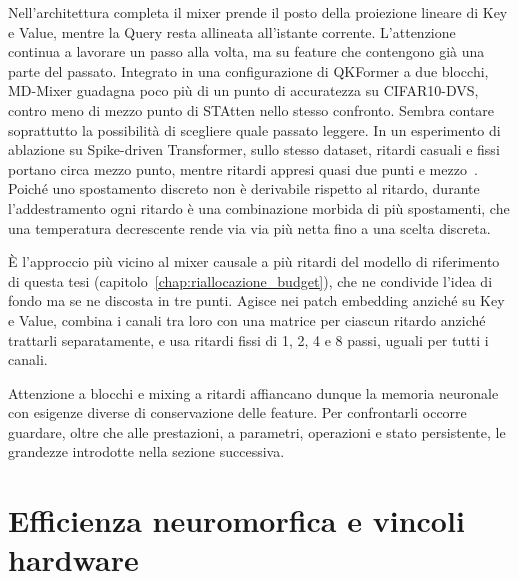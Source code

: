 Nell'architettura completa il mixer prende il posto della proiezione lineare di Key e Value, mentre la Query resta allineata all'istante corrente. L'attenzione continua a lavorare un passo alla volta, ma su feature che contengono già una parte del passato. Integrato in una configurazione di QKFormer a due blocchi, MD-Mixer guadagna poco più di un punto di accuratezza su CIFAR10-DVS, contro meno di mezzo punto di STAtten nello stesso confronto. Sembra contare soprattutto la possibilità di scegliere quale passato leggere. In un esperimento di ablazione su Spike-driven Transformer, sullo stesso dataset, ritardi casuali e fissi portano circa mezzo punto, mentre ritardi appresi quasi due punti e mezzo~\cite{shi2026multidelay}. Poiché uno spostamento discreto non è derivabile rispetto al ritardo, durante l'addestramento ogni ritardo è una combinazione morbida di più spostamenti, che una temperatura decrescente rende via via più netta fino a una scelta discreta.

È l'approccio più vicino al mixer causale a più ritardi del modello di riferimento di questa tesi (capitolo~\ref{chap:riallocazione_budget}), che ne condivide l'idea di fondo ma se ne discosta in tre punti. Agisce nei patch embedding anziché su Key e Value, combina i canali tra loro con una matrice per ciascun ritardo anziché trattarli separatamente, e usa ritardi fissi di 1, 2, 4 e 8 passi, uguali per tutti i canali.


Attenzione a blocchi e mixing a ritardi affiancano dunque la memoria neuronale con esigenze diverse di conservazione delle feature. Per confrontarli occorre guardare, oltre che alle prestazioni, a parametri, operazioni e stato persistente, le grandezze introdotte nella sezione successiva.



\section{Efficienza neuromorfica e vincoli hardware}
\label{sec:efficienza_neuromorfica_vincoli}

